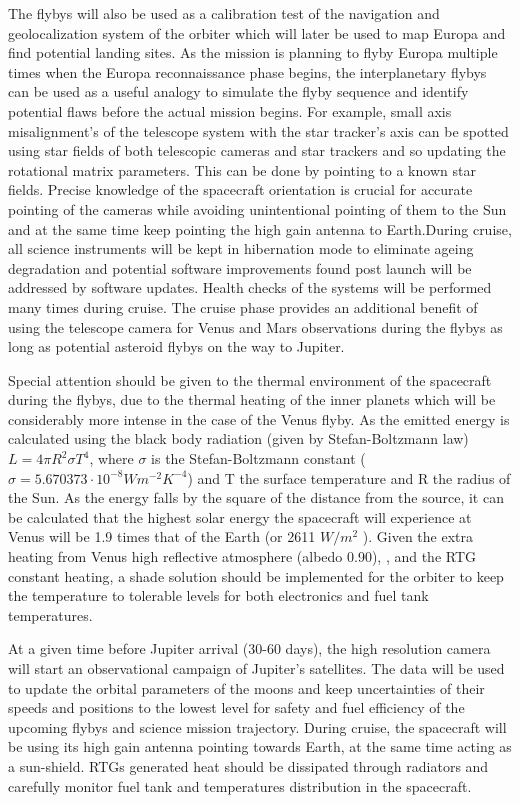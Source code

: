 The flybys will also be used as a calibration test of the navigation and geolocalization system of the orbiter which will later be used to map Europa and find potential landing sites. As the mission is planning to flyby Europa multiple times when the Europa reconnaissance phase begins, the interplanetary flybys can be used as a useful analogy to simulate the flyby sequence and identify potential flaws before the actual mission begins. For example, small axis misalignment's of the telescope system with the star tracker’s axis can be spotted using star fields of both telescopic cameras and star trackers and so updating the rotational matrix parameters. This can be done by pointing to a known star fields. Precise knowledge of the spacecraft orientation is crucial for accurate pointing of the cameras while avoiding unintentional pointing of them to the Sun and at the same time keep pointing the high gain antenna to Earth.During cruise, all science instruments will be kept in hibernation mode to eliminate ageing degradation and potential software improvements found post launch will be addressed by software updates. Health checks of the systems will be performed many times during cruise. The cruise phase provides an additional benefit of using the telescope camera for Venus and Mars observations during the flybys as long as potential asteroid flybys on the way to Jupiter.

Special attention should be given to the thermal environment of the spacecraft during the flybys, due to the thermal heating of the inner planets which will be considerably more intense in the case of the Venus flyby. As the emitted energy is calculated using the black body radiation (given by Stefan-Boltzmann law)$L=4\pi R^2\sigma T^4$, where $\sigma$ is the Stefan-Boltzmann constant ($\sigma=5.670373\cdot 10^{-8}  Wm^{-2} K^{-4}$) and T the surface temperature and R the radius of the Sun. As the energy falls by the square of the distance from the source, it can be calculated that the highest solar energy the spacecraft will experience at Venus will be 1.9 times that of the Earth (or 2611 $W/m^2$ ). Given the extra heating from Venus high reflective atmosphere (albedo 0.90), \cite{venus_fact}, and the RTG constant heating, a shade solution should be implemented for the orbiter to keep the temperature to tolerable levels for both electronics and fuel tank temperatures. 

At a given time before Jupiter arrival (30-60 days), the high resolution camera will start an observational campaign of Jupiter’s satellites. The data will be used to update the orbital parameters of the moons and keep uncertainties of their speeds and positions to the lowest level for safety and fuel efficiency of the upcoming flybys and science mission trajectory. During cruise, the spacecraft will be using its high gain antenna pointing towards Earth, at the same time acting as a sun-shield. RTGs generated heat should be dissipated through radiators and carefully monitor fuel tank and temperatures distribution in the spacecraft.


